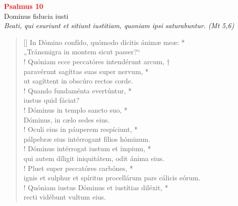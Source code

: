 


\def\greinitialformat#1{%
{\fontsize{39}{39}\selectfont #1}%
}




\vspace{0.3cm}
\begin{center}
 \textcolor{red}{\large \bf Psalmus 10}\\
Dominus fiducia iusti\\
\textit{\small Beati, qui esuriunt et sitiunt iustitiam, quoniam ipsi saturabuntur. (Mt 5,6)}
\end{center}
\begin{verse}[\versewidth]
In Dómino confído, quómodo dícitis ánimæ meæ: *\\
„Tránsmigra in montem sicut passer?“\\!
\vin Quóniam ecce peccatóres intendérunt arcum, †\\
\vin paravérunt sagíttas suas super nervum, *\\
\vin ut sagíttent in obscúro rectos corde.\\!
Quando fundaménta evertúntur, *\\
iustus quid fáciat?\\!
\vin Dóminus in templo sancto suo, *\\
\vin Dóminus, in cælo sedes eius.\\!
Oculi eius in páuperem respíciunt, *\\
pálpebræ eius intérrogant fílios hóminum.\\!
\vin Dóminus intérrogat iustum et ímpium, *\\
\vin qui autem díligit iniquitátem, odit ánima eius.\\!
Pluet super peccatóres carbónes, *\\
ignis et sulphur et spíritus procellárum pars cálicis eórum.\\!
\vin Quóniam iustus Dóminus et iustítias diléxit, *\\
\vin recti vidébunt vultum eius.\\
\end{verse}
\vspace{1cm}


